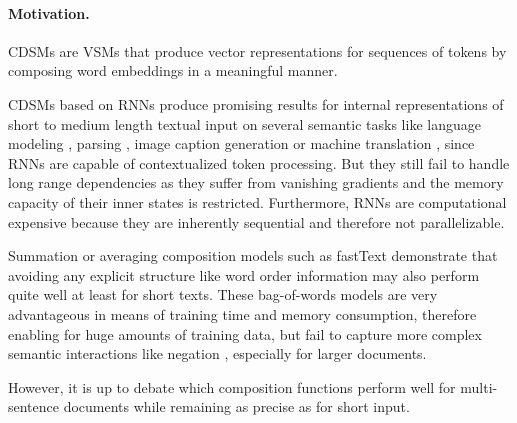 \paragraph{Motivation.}\acfp{CDSM}\autocite{clark_compositional_2008,grefenstette_experimental_2011} are \acp{VSM} \autocite{salton_vector_1975} that produce vector representations for sequences of tokens by composing word embeddings in a meaningful manner. 

\acp{CDSM} based on \acp{RNN}\autocite{hopfield_neural_1982} produce promising results for internal representations of short to medium length textual input on several semantic tasks like  language modeling \autocite{sundermeyer_lstm_2012}, parsing \autocite{dyer_recurrent_2016}, image caption generation %
\autocite{vinyals_show_2014} or machine translation \autocite{wu_googles_2016}%
, since \acp{RNN} are capable of contextualized token processing. But they still fail to handle long range dependencies as they suffer from vanishing gradients and the memory capacity of their inner states is restricted. %
Furthermore, \acp{RNN} are computational expensive because they are inherently sequential and therefore not parallelizable. 

Summation or averaging composition models such as fastText \autocite{joulin_bag_2017} demonstrate that avoiding any explicit structure like word order information %
may also perform quite well at least for short texts. These bag-of-words models are very advantageous in means of training time and memory consumption, therefore enabling for huge amounts of training data, but fail to capture more complex semantic interactions like negation%
, especially for larger documents. 

However, it is up to debate which composition functions perform well for multi-sentence documents while remaining as precise as for short input.%


